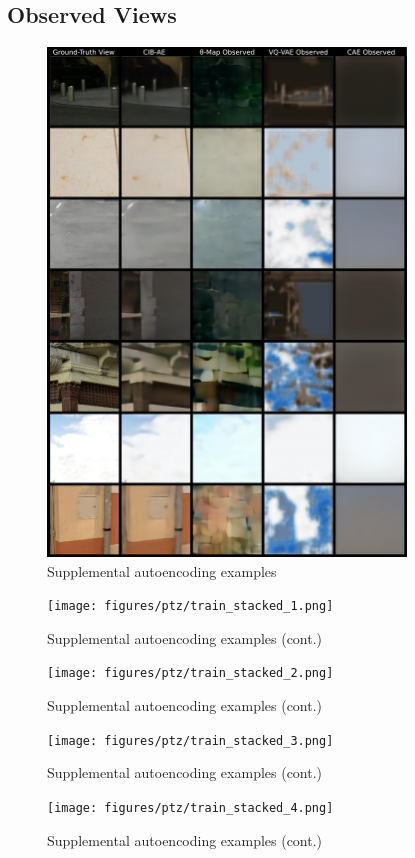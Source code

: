 \begin{appendices}
\section{Observed Views} \label{sec:app-predictions-observed}
\begin{figure}[H]
    \centering
    \includegraphics[width=0.85\textwidth]{figures/ptz/train_stacked_0.png}
    \caption{Supplemental autoencoding examples}
    \label{fig:supl-predictions-obs1}
\end{figure}
\begin{figure}[H]
    \centering
    \texttt{[image: figures/ptz/train\_stacked\_1.png]}
    \caption{Supplemental autoencoding examples (cont.)}
    \label{fig:supl-predictions-obs2}
\end{figure}
\begin{figure}[H]
    \centering
    \texttt{[image: figures/ptz/train\_stacked\_2.png]}
    \caption{Supplemental autoencoding examples (cont.)}
    \label{fig:supl-predictions-obs3}
\end{figure}
\begin{figure}[H]
    \centering
    \texttt{[image: figures/ptz/train\_stacked\_3.png]}
    \caption{Supplemental autoencoding examples (cont.)}
    \label{fig:supl-predictions-obs4}
\end{figure}
\begin{figure}[H]
    \centering
    \texttt{[image: figures/ptz/train\_stacked\_4.png]}
    \caption{Supplemental autoencoding examples (cont.)}
    \label{fig:supl-predictions-obs5}    
\end{figure}


\end{appendices}

